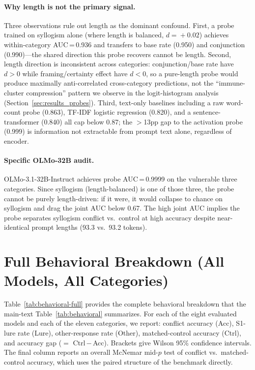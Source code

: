 \documentclass{article}
\begin{document}
\paragraph{Why length is not the primary signal.}
Three observations rule out length as the dominant confound.  First,
a probe trained on syllogism alone (where length is balanced,
$d\!=\!+0.02$) achieves within-category AUC\,=\,0.936 and transfers
to base rate (0.950) and conjunction (0.990)---the shared direction
this probe recovers cannot be length.  Second, length direction
is inconsistent across categories: conjunction/base rate have
$d\!>\!0$ while framing/certainty effect have $d\!<\!0$, so a
pure-length probe would produce maximally anti-correlated cross-category
predictions, not the ``immune-cluster compression'' pattern we
observe in the logit-histogram analysis (Section~\ref{sec:results_probes}).  Third, text-only baselines including a raw word-count probe (0.863), TF-IDF
logistic regression (0.820), and a sentence-transformer (0.840) all cap below 0.87;
the $>$13pp gap to the activation probe (0.999) is
information not extractable from prompt text alone, regardless of encoder.

\paragraph{Specific OLMo-32B audit.}
OLMo-3.1-32B-Instruct achieves probe AUC\,=\,0.9999 on the vulnerable
three categories.  Since syllogism (length-balanced) is one of those
three, the probe cannot be purely length-driven: if it were, it
would collapse to chance on syllogism and drag the joint AUC below
0.67.  The high joint AUC implies the probe separates syllogism
conflict vs.\ control at high accuracy despite near-identical
prompt lengths (93.3 vs.\ 93.2 tokens).

\section{Full Behavioral Breakdown (All Models, All Categories)}
\label{app:full_behavior}

Table~\ref{tab:behavioral-full} provides the complete behavioral
breakdown that the main-text Table~\ref{tab:behavioral}
summarizes.  For each of the eight evaluated
models and each of the eleven categories, we report: conflict
accuracy (Acc), S1-lure rate (Lure), other-response rate (Other),
matched-control accuracy (Ctrl), and accuracy gap ($=$ Ctrl\,$-$\,Acc).
Brackets give Wilson 95\% confidence intervals.  The final column
reports an overall McNemar mid-$p$ test of conflict vs.\ matched-control
accuracy, which uses the paired structure of the benchmark directly.
\end{document}
